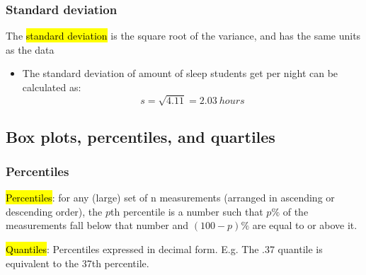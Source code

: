 \documentclass[slidestop,compress,mathserif]{beamer}
\makeatletter
\newcommand{\soln}[1]{\textit{#1}}
\def\chpii@path{../../Chp 2}
\makeatother
\begin{document}



\begin{frame}
\frametitle{Standard deviation}

The \hl{standard deviation} is the square root of the variance, and has the same units as the data

\formula{
\[ s = \sqrt{s^2} \]
}

\pause

{
\begin{itemize}

\item The standard deviation of amount of sleep students get per night can be calculated as:
\[ s = \sqrt{4.11} = 2.03~hours\]

\end{itemize}
}
{
}

\end{frame}


\subsection{Box plots, percentiles, and quartiles}

\begin{frame}
\frametitle{Percentiles}

\hl{Percentiles}: for any (large) set of n measurements (arranged in ascending or descending order), the $p$th percentile is a number such that $p\%$ of the measurements fall below that number and $(100-p)\%$ are equal to or above it.

\hl{Quantiles}: Percentiles expressed in decimal form.  E.g. The .37 quantile is equivalent to the 37th percentile.

\end{frame}
\end{document}
